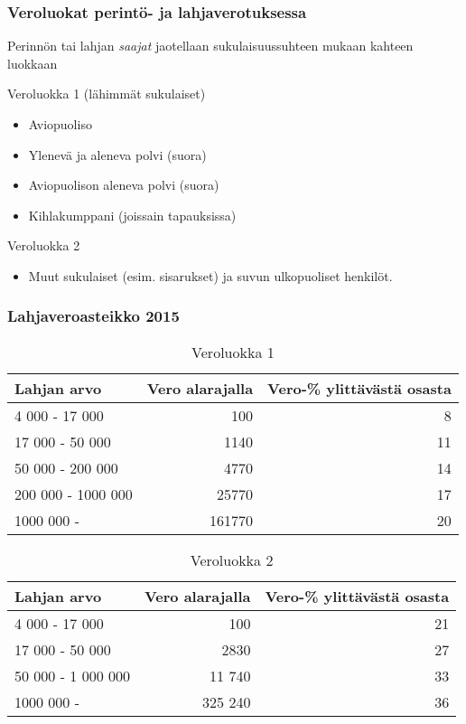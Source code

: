\documentclass{beamer}
\newcommand{\pblock}{\\ \vspace{0.5cm}\pause}
\begin{document}
\begin{frame}
	\frametitle{Veroluokat perintö- ja lahjaverotuksessa}
	\pause
	Perinnön tai lahjan \emph{saajat} jaotellaan sukulaisuussuhteen mukaan kahteen luokkaan
	\pblock
	\begin{block}{Veroluokka 1 (lähimmät sukulaiset)}
		\begin{itemize}
			\item Aviopuoliso
			\item Ylenevä ja aleneva polvi (suora)
			\item Aviopuolison aleneva polvi (suora)
			\item Kihlakumppani (joissain tapauksissa)
		\end{itemize}
	\end{block}
	\begin{block}{Veroluokka 2}
		\begin{itemize}
			\item Muut sukulaiset (esim. sisarukset) ja suvun ulkopuoliset henkilöt.
		\end{itemize}
	\end{block}
\end{frame}
\begin{frame}
	\frametitle{Lahjaveroasteikko 2015}
\begin{table}[h]
\begin{tabular}{|lrr|}
\hline
Lahjan arvo      & Vero alarajalla & Vero-\% ylittävästä osasta \\ \hline
4 000 - 17 000     & 100             & 8                                \\
17 000 - 50 000    & 1140            & 11                               \\
50 000 - 200 000   & 4770            & 14                               \\
200 000 - 1000 000 & 25770           & 17                               \\
1000 000 -        & 161770          & 20                     \\
\hline         
\end{tabular}
\caption{Veroluokka 1}
\end{table}

\begin{table}[h]
\begin{tabular}{|lrr|}
\hline
Lahjan arvo        & Vero alarajalla & Vero-\% ylittävästä osasta \\ \hline
4 000 - 17 000     & 100             & 21                               \\
17 000 - 50 000    & 2830            & 27                               \\
50 000 - 1 000 000 & 11 740          & 33                               \\
1000 000 -         & 325 240         & 36   \\
\hline                           
\end{tabular}
\caption{Veroluokka 2}
\end{table}
\end{frame}
\end{document}
